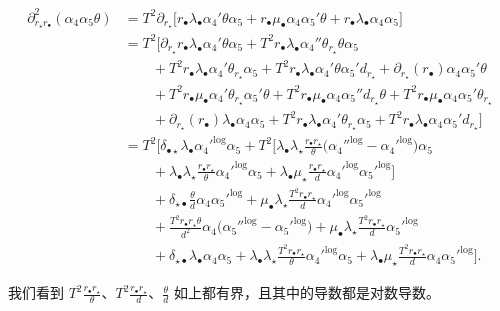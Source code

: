\begin{align*}
\partial^2_{r_\star r_\bullet}(\alpha_4\alpha_5\theta)
&=T^2\partial_{r_\star}\big[r_\bullet\lambda_\bullet\alpha_4'\theta\alpha_5+r_\bullet\mu_\bullet\alpha_4\alpha_5'\theta+r_\bullet\lambda_\bullet\alpha_4\alpha_5\big]\\
&=T^2\big[\partial_{r_\star}r_\bullet\lambda_\bullet\alpha_4'\theta\alpha_5
+T^2r_\bullet\lambda_\bullet\alpha_4''\theta_{r_\star}\theta\alpha_5\\
&\qquad+T^2r_\bullet\lambda_\bullet\alpha_4'\theta_{r_\star}\alpha_5
+T^2r_\bullet\lambda_\bullet\alpha_4'\theta\alpha_5'd_{r_\star}
+\partial_{r_\star}(r_\bullet)\alpha_4\alpha_5'\theta\\
&\qquad+T^2r_\bullet\mu_\bullet\alpha_4'\theta_{r_\star}\alpha_5'\theta
+T^2r_\bullet\mu_\bullet\alpha_4\alpha_5''d_{r_\star}\theta
+T^2r_\bullet\mu_\bullet\alpha_4\alpha_5'\theta_{r_\star}\\
&\qquad+\partial_{r_\star}(r_\bullet)\lambda_\bullet\alpha_4\alpha_5
+T^2r_\bullet\lambda_\bullet\alpha_4'\theta_{r_\star}\alpha_5
+T^2r_\bullet\lambda_\bullet\alpha_4\alpha_5'd_{r_\star}\big]\\
&=T^2\Big[\delta_{\bullet\star}\lambda_\bullet{\alpha_4'}^{\log}\alpha_5
+T^2\Big[\lambda_\bullet\lambda_\star\frac{r_\bullet r_\star}{\theta}\big({\alpha_4''}^{\log}-{\alpha_4'}^{\log}\big)\alpha_5\\
&\qquad+\lambda_\bullet\lambda_\star\frac{r_\bullet r_\star}{\theta}{\alpha_4'}^{\log}\alpha_5
+\lambda_\bullet\mu_\star\frac{r_\bullet r_\star}{d}{\alpha_4'}^{\log}{\alpha_5'}^{\log}\Big]\\
&\qquad+\delta_{\star\bullet}\frac{\theta}{d}\alpha_4{\alpha_5'}^{\log}
+\mu_\bullet\lambda_\star\frac{T^2r_\bullet r_\star}{d}{\alpha_4'}^{\log}{\alpha_5'}^{\log}\\
&\qquad+\frac{T^2r_\bullet r_\star\theta}{d^2}\alpha_4\big({\alpha_5''}^{\log}-{\alpha_5'}^{\log}\big)
+\mu_\bullet\lambda_\star\frac{T^2r_\bullet r_\star}{d}{\alpha_5'}^{\log}\\
&\qquad+\delta_{\star\bullet}\lambda_\bullet\alpha_4\alpha_5
+\lambda_\bullet\lambda_\star\frac{T^2r_\bullet r_\star}{\theta}{\alpha_4'}^{\log}\alpha_5
+\lambda_\bullet\mu_\star\frac{T^2r_\bullet r_\star}{d}\alpha_4{\alpha_5'}^{\log}\Big].
\end{align*}

我们看到 $T^2\frac{r_\bullet r_\star}{\theta}$、$T^2\frac{r_\bullet r_\star}{d}$、$\frac{\theta}{d}$ 如上都有界，且其中的导数都是对数导数。

